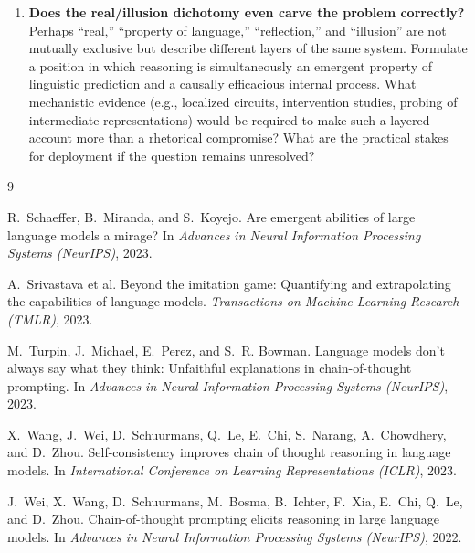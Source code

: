 \documentclass[11pt]{article}
\begin{document}
\begin{enumerate}[leftmargin=*,label=\textbf{Q\arabic*.}]
\item \textbf{Does the real/illusion dichotomy even carve the problem correctly?}
Perhaps ``real,'' ``property of language,'' ``reflection,'' and ``illusion'' are not mutually exclusive but describe different layers of the same system. Formulate a position in which reasoning is simultaneously an emergent property of linguistic prediction and a causally efficacious internal process. What mechanistic evidence (e.g., localized circuits, intervention studies, probing of intermediate representations) would be required to make such a layered account more than a rhetorical compromise? What are the practical stakes for deployment if the question remains unresolved?

\end{enumerate}


\begin{thebibliography}{9}

R.~Schaeffer, B.~Miranda, and S.~Koyejo.
\newblock Are emergent abilities of large language models a mirage?
\newblock In \emph{Advances in Neural Information Processing Systems (NeurIPS)}, 2023.

A.~Srivastava et al.
\newblock Beyond the imitation game: Quantifying and extrapolating the capabilities of language models.
\newblock \emph{Transactions on Machine Learning Research (TMLR)}, 2023.

M.~Turpin, J.~Michael, E.~Perez, and S.~R. Bowman.
\newblock Language models don't always say what they think: Unfaithful explanations in chain-of-thought prompting.
\newblock In \emph{Advances in Neural Information Processing Systems (NeurIPS)}, 2023.

X.~Wang, J.~Wei, D.~Schuurmans, Q.~Le, E.~Chi, S.~Narang, A.~Chowdhery, and D.~Zhou.
\newblock Self-consistency improves chain of thought reasoning in language models.
\newblock In \emph{International Conference on Learning Representations (ICLR)}, 2023.

J.~Wei, X.~Wang, D.~Schuurmans, M.~Bosma, B.~Ichter, F.~Xia, E.~Chi, Q.~Le, and D.~Zhou.
\newblock Chain-of-thought prompting elicits reasoning in large language models.
\newblock In \emph{Advances in Neural Information Processing Systems (NeurIPS)}, 2022.

\end{thebibliography}
\end{document}
